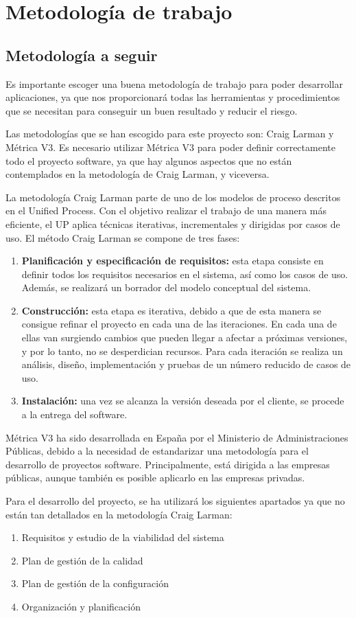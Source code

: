 
\section{Metodología de trabajo}
\subsection {Metodología a seguir}
\par Es importante escoger una buena metodología de trabajo para poder desarrollar aplicaciones, ya que nos proporcionará todas las herramientas y procedimientos que se necesitan para conseguir un buen resultado y reducir el riesgo.
\par Las metodologías que se han escogido para este proyecto son: Craig Larman y Métrica V3. Es necesario utilizar Métrica V3 para poder definir correctamente todo el proyecto software, ya que hay algunos aspectos que no están contemplados en la metodología de Craig Larman, y viceversa.
\par La metodología Craig Larman parte de uno de los modelos de proceso descritos en el Unified Process. Con el objetivo realizar el trabajo de una manera más eficiente, el UP aplica técnicas iterativas, incrementales y dirigidas por casos de uso. El método Craig Larman se compone de tres fases:
\begin{enumerate}[1.]
\item \textbf{Planificación y especificación de requisitos:} esta etapa consiste en definir todos los requisitos necesarios en el sistema, así como los casos de uso. Además, se realizará un borrador del modelo conceptual del sistema.
\item \textbf{Construcción:} esta etapa es iterativa, debido a que de esta manera se consigue refinar el proyecto en cada una de las iteraciones. En cada una de ellas van surgiendo cambios que pueden llegar a afectar a próximas versiones, y por lo tanto, no se desperdician recursos. Para cada iteración se realiza un análisis, diseño, implementación y pruebas de un número reducido de casos de uso.
\item \textbf{Instalación:} una vez se alcanza la versión deseada por el cliente, se procede a la entrega del software.
\end{enumerate}
\par Métrica V3 ha sido desarrollada en España por el Ministerio de Administraciones Públicas, debido a la necesidad de estandarizar una metodología para el desarrollo de proyectos software. Principalmente, está dirigida a las empresas públicas, aunque también es posible aplicarlo en las empresas privadas.
\par Para el desarrollo del proyecto, se ha utilizará los siguientes apartados ya que no están tan detallados en la metodología Craig Larman:
\begin{enumerate}[1.]
\item Requisitos y estudio de la viabilidad del sistema
\item Plan de gestión de la calidad
\item Plan de gestión de la configuración
\item Organización y planificación
\end{enumerate}
